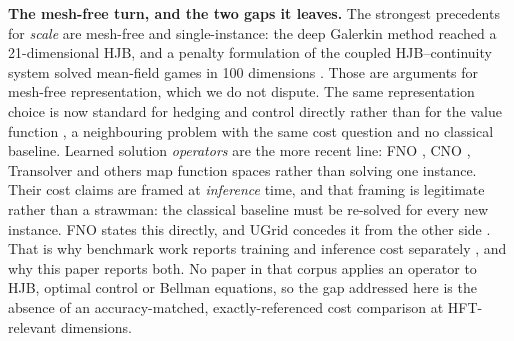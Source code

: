 \documentclass[conference]{IEEEtran}
\begin{document}
\textbf{The mesh-free turn, and the two gaps it leaves.} The strongest precedents for \emph{scale}
are mesh-free and single-instance: the deep Galerkin method reached a 21-dimensional HJB, and a
penalty formulation of the coupled HJB--continuity system solved mean-field games in 100 dimensions
\cite{carmona2020machine}. Those are arguments for mesh-free representation, which we do not
dispute. The same representation choice is now standard for hedging and control directly rather than
for the value function \cite{buehler2019deep}, a neighbouring problem with the same cost question
and no classical baseline. Learned solution \emph{operators} are the more recent line: FNO
\cite{li2021fourier,li2023neural}, CNO \cite{raonic2023convolutional}, Transolver
\cite{wu2024transolver} and others map function spaces rather than solving one instance. Their cost
claims are framed at \emph{inference} time, and that framing is legitimate rather than a strawman:
the classical baseline must be re-solved for every new instance. FNO states this directly, and UGrid
concedes it from the other side \cite{han2024ugrid}. That is why benchmark work reports training and
inference cost separately \cite{pdenneval2024}, and why this paper reports
both. No paper in that corpus applies an operator to HJB, optimal control or Bellman equations, so
the gap addressed here is the absence of an accuracy-matched, exactly-referenced cost comparison at
HFT-relevant dimensions.
\end{document}
